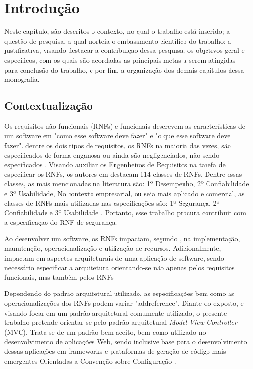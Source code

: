 \chapter{Introdução}

Neste capítulo, são descritos o contexto, no qual o trabalho está inserido; a questão de pesquisa, a qual norteia o embasamento científico do trabalho;  a justificativa, visando destacar a contribuição dessa pesquisa; os objetivos geral e específicos, com os quais são acordadas as principais metas a serem atingidas para conclusão do trabalho, e por fim, a organização dos demais capítulos dessa monografia.

\section{Contextualização}

Os requisitos não-funcionais (RNFs) e funcionais descrevem as características de um software em "como esse software deve fazer" e "o que esse software deve fazer". \cite{sommerville1997requirements} dentre os dois tipos de requisitos, os RNFs na maioria das vezes, são especificados de forma enganosa ou ainda são negligenciados, não sendo especificados \cite{eckhardt2016non}. Visando auxiliar os Engenheiros de Requisitos na tarefa de especificar os RNFs, os autores em \cite{mairiza2010investigation} destacam 114 classes de RNFs. Dentre essas classes, as mais mencionadas na literatura são: 1º Desempenho, 2º Confiabilidade e  3º Usabilidade, No contexto empresarial, ou seja mais aplicado e comercial, as classes de RNFs mais utilizadas nas especificações são: 1º Segurança, 2º Confiabilidade e 3º Usabilidade \cite{eckhardt2016non}. Portanto, esse trabalho procura contribuir com a especificação do RNF de segurança.

Ao desenvolver um software, os RNFs impactam, segundo \cite{eckhardt2016non}, na implementação, manutenção, operacionalização e utilização de recursos. Adicionalmente, impactam em aspectos arquiteturais de uma aplicação de software, sendo necessário especificar a arquitetura orientando-se não apenas pelos requisitos funcionais, mas também pelos RNFs \cite{buschmann1996system}

Dependendo do padrão arquitetural utilizado, as especificações bem como as operacionalizações dos RNFs podem variar "addreference". Diante do exposto, e visando focar em um padrão arquitetural comumente utilizado, o presente trabalho pretende orientar-se pelo padrão arquitetural \textit{Model-View-Controller} (MVC). Trata-se de um padrão bem aceito, bem como utilizado no desenvolvimento de aplicações Web, sendo inclusive base para o desenvolvimento dessas aplicações em frameworks e plataformas de geração de código mais emergentes Orientadas a Convenção sobre Configuração \cite{jailia2016behavior}.


